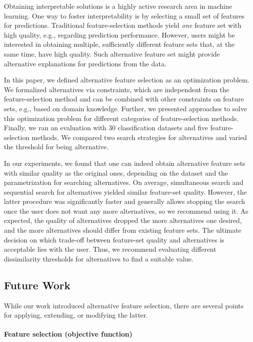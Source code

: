 \documentclass{article}
\theoremstyle{definition}
\begin{document}
Obtaining interpretable solutions is a highly active research area in machine learning.
One way to foster interpretability is by selecting a small set of features for predictions.
Traditional feature-selection methods yield \emph{one} feature set with high quality, e.g., regarding prediction performance.
However, users might be interested in obtaining multiple, sufficiently different feature sets that, at the same time, have high quality.
Such alternative feature set might provide alternative explanations for predictions from the data.

In this paper, we defined alternative feature selection as an optimization problem.
We formalized alternatives via constraints, which are independent from the feature-selection method and can be combined with other constraints on feature sets, e.g., based on domain knowledge.
Further, we presented approaches to solve this optimization problem for different categories of feature-selection methods.
Finally, we ran an evaluation with 30 classification datasets and five feature-selection methods.
We compared two search strategies for alternatives and varied the threshold for being alternative.

In our experiments, we found that one can indeed obtain alternative feature sets with similar quality as the original ones, depending on the dataset and the parametrization for searching alternatives.
On average, simultaneous search and sequential search for alternatives yielded similar feature-set quality.
However, the latter procedure was significantly faster and generally allows stopping the search once the user does not want any more alternatives, so we recommend using it.
As expected, the quality of alternatives dropped the more alternatives one desired, and the more alternatives should differ from existing feature sets.
The ultimate decision on which trade-off between feature-set quality and alternatives is acceptable lies with the user.
Thus, we recommend evaluating different dissimilarity thresholds for alternatives to find a suitable value.

\subsection{Future Work}

While our work introduced alternative feature selection, there are several points for applying, extending, or modifying the latter.

\paragraph{Feature selection (objective function)}
\end{document}
